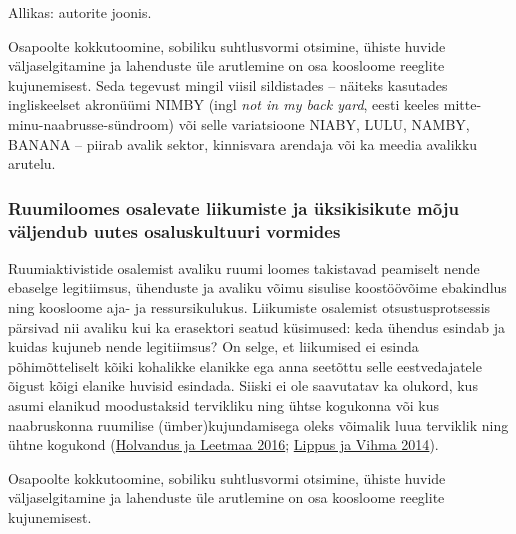 \documentclass[estonian,]{article}
\begin{document}
\begin{imgsource}
{Allikas:} autorite joonis.
\end{imgsource}

Osapoolte kokkutoomine, sobiliku suhtlusvormi otsimine, ühiste huvide väljaselgitamine ja lahenduste üle arutlemine on osa koosloome reeglite kujunemisest. Seda tegevust mingil viisil sildistades -- näiteks kasutades ingliskeelset akronüümi NIMBY (ingl \emph{not in my back yard}, eesti keeles mitte-minu-naabrusse-sündroom) või selle variatsioone NIABY, LULU, NAMBY, BANANA -- piirab avalik sektor, kinnisvara arendaja või ka meedia avalikku arutelu.

\hypertarget{ruumiloomes-osalevate-liikumiste-ja-uxfcksikisikute-muxf5ju-vuxe4ljendub-uutes-osaluskultuuri-vormides}{%
\subsubsection*{Ruumiloomes osalevate liikumiste ja üksikisikute mõju väljendub uutes osaluskultuuri vormides}\label{ruumiloomes-osalevate-liikumiste-ja-uxfcksikisikute-muxf5ju-vuxe4ljendub-uutes-osaluskultuuri-vormides}}

Ruumiaktivistide osalemist avaliku ruumi loomes takistavad peamiselt nende ebaselge legitiimsus, ühenduste ja avaliku võimu sisulise koostöövõime ebakindlus ning koosloome aja- ja ressursikulukus. Liikumiste osalemist otsustusprotsessis pärsivad nii avaliku kui ka erasektori seatud küsimused: keda ühendus esindab ja kuidas kujuneb nende legitiimsus? On selge, et liikumised ei esinda põhimõtteliselt kõiki kohalikke elanikke ega anna seetõttu selle eestvedajatele õigust kõigi elanike huvisid esindada. Siiski ei ole saavutatav ka olukord, kus asumi elanikud moodustaksid tervikliku ning ühtse kogukonna või kus naabruskonna ruumilise (ümber)kujundamisega oleks võimalik luua terviklik ning ühtne kogukond (\protect\hyperlink{Holvandus2016}{Holvandus ja Leetmaa 2016}; \protect\hyperlink{Holvandus2016}{Lippus ja Vihma 2014}).

\begin{blockquote-right}
Osapoolte kokkutoomine, sobiliku suhtlusvormi otsimine, ühiste huvide
väljaselgitamine ja lahenduste üle arutlemine on osa koosloome reeglite
kujunemisest.
\end{blockquote-right}
\end{document}
